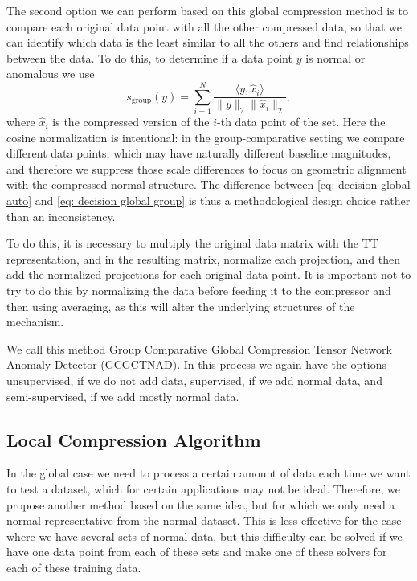 \documentclass{article}
\begin{document}
The second option we can perform based on this global compression method is to compare each original data point with all the other compressed data, so that we can identify which data is the least similar to all the others and find relationships between the data. To do this, to determine if a data point $y$ is normal or anomalous we use
\begin{equation}\label{eq: decision global group}
    s_{\mathrm{group}}(y)=\sum_{i=1}^N\frac{\langle y,\hat x_i\rangle}{\lVert y\rVert_2\lVert \hat x_i\rVert_2},
\end{equation}
where $\hat x_i$ is the compressed version of the $i$-th data point of the set. Here the cosine normalization is intentional: in the group-comparative setting we compare different data points, which may have naturally different baseline magnitudes, and therefore we suppress those scale differences to focus on geometric alignment with the compressed normal structure. The difference between \eqref{eq: decision global auto} and \eqref{eq: decision global group} is thus a methodological design choice rather than an inconsistency.

To do this, it is necessary to multiply the original data matrix with the TT representation, and in the resulting matrix, normalize each projection, and then add the normalized projections for each original data point. It is important not to try to do this by normalizing the data before feeding it to the compressor and then using averaging, as this will alter the underlying structures of the mechanism.

We call this method Group Comparative Global Compression Tensor Network Anomaly Detector (GCGCTNAD). In this process we again have the options unsupervised, if we do not add data, supervised, if we add normal data, and semi-supervised, if we add mostly normal data.

\subsection{Local Compression Algorithm}
In the global case we need to process a certain amount of data each time we want to test a dataset, which for certain applications may not be ideal. Therefore, we propose another method based on the same idea, but for which we only need a normal representative from the normal dataset. This is less effective for the case where we have several sets of normal data, but this difficulty can be solved if we have one data point from each of these sets and make one of these solvers for each of these training data.
\end{document}
